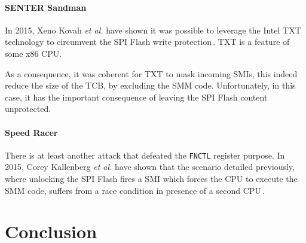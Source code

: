 \paragraph{SENTER Sandman}
%
In 2015, Xeno Kovah \emph{et al.} have shown it was possible to leverage the
Intel TXT technology to circumvent the SPI Flash write
protection\,\cite{kovah2015senter}.
%
TXT is a feature of some x86 CPU.
%

As a consequence, it was coherent for TXT to mask incoming SMIs, this indeed
reduce the size of the TCB, by excluding the SMM code.
%
Unfortunately, in this case, it has the important consequence of leaving the SPI
Flash content unprotected.

\paragraph{Speed Racer}
%
There is at least another attack that defeated the \texttt{FNCTL} register
purpose.
%
In 2015, Corey Kallenberg \emph{et al.} have shown that the scenario detailed
previously, where unlocking the SPI Flash fires a SMI which forces the CPU to
execute the SMM code, suffers from a race condition in presence of a second
CPU\,\cite{kallenberg2015racecondition}.

\section{Conclusion}
\label{sec:usecase:conclusion}
